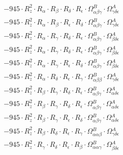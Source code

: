 \documentclass{article}
\begin{document}
\begin{subequations}
\begin{gather}
\begin{array}{c}
 \\[0.2em] 		 - 945 \cdot R_{z}^{2} \cdot R_{\alpha{}} \cdot R_{\beta{}} \cdot R_{\delta{}} \cdot R_{\epsilon{}} \cdot \Omega{}^{B}_{\alpha{}\beta{}\gamma{}} \cdot \Omega{}^{A}_{\gamma{}\delta{}\epsilon{}} 
 \\[0.2em] 		 - 945 \cdot R_{z}^{2} \cdot R_{\alpha{}} \cdot R_{\beta{}} \cdot R_{\epsilon{}} \cdot R_{\delta{}} \cdot \Omega{}^{B}_{\alpha{}\beta{}\gamma{}} \cdot \Omega{}^{A}_{\gamma{}\delta{}\epsilon{}} 
 \\[0.2em] 		 - 945 \cdot R_{z}^{2} \cdot R_{\alpha{}} \cdot R_{\gamma{}} \cdot R_{\delta{}} \cdot R_{\epsilon{}} \cdot \Omega{}^{B}_{\alpha{}\beta{}\gamma{}} \cdot \Omega{}^{A}_{\beta{}\delta{}\epsilon{}} 
 \\[0.2em] 		 - 945 \cdot R_{z}^{2} \cdot R_{\alpha{}} \cdot R_{\gamma{}} \cdot R_{\delta{}} \cdot R_{\epsilon{}} \cdot \Omega{}^{B}_{\alpha{}\beta{}\gamma{}} \cdot \Omega{}^{A}_{\beta{}\delta{}\epsilon{}} 
 \\[0.2em] 		 - 945 \cdot R_{z}^{2} \cdot R_{\alpha{}} \cdot R_{\gamma{}} \cdot R_{\epsilon{}} \cdot R_{\delta{}} \cdot \Omega{}^{B}_{\alpha{}\beta{}\gamma{}} \cdot \Omega{}^{A}_{\beta{}\delta{}\epsilon{}} 
 \\[0.2em] 		 - 945 \cdot R_{z}^{2} \cdot R_{\alpha{}} \cdot R_{\delta{}} \cdot R_{\epsilon{}} \cdot R_{\gamma{}} \cdot \Omega{}^{B}_{\alpha{}\beta{}\beta{}} \cdot \Omega{}^{A}_{\gamma{}\delta{}\epsilon{}} 
 \\[0.2em] 		 - 945 \cdot R_{z}^{2} \cdot R_{\beta{}} \cdot R_{\gamma{}} \cdot R_{\delta{}} \cdot R_{\epsilon{}} \cdot \Omega{}^{B}_{\alpha{}\beta{}\gamma{}} \cdot \Omega{}^{A}_{\alpha{}\delta{}\epsilon{}} 
 \\[0.2em] 		 - 945 \cdot R_{z}^{2} \cdot R_{\beta{}} \cdot R_{\gamma{}} \cdot R_{\delta{}} \cdot R_{\epsilon{}} \cdot \Omega{}^{B}_{\alpha{}\beta{}\gamma{}} \cdot \Omega{}^{A}_{\alpha{}\delta{}\epsilon{}} 
 \\[0.2em] 		 - 945 \cdot R_{z}^{2} \cdot R_{\beta{}} \cdot R_{\gamma{}} \cdot R_{\epsilon{}} \cdot R_{\delta{}} \cdot \Omega{}^{B}_{\alpha{}\beta{}\gamma{}} \cdot \Omega{}^{A}_{\alpha{}\delta{}\epsilon{}} 
 \\[0.2em] 		 - 945 \cdot R_{z}^{2} \cdot R_{\beta{}} \cdot R_{\delta{}} \cdot R_{\epsilon{}} \cdot R_{\gamma{}} \cdot \Omega{}^{B}_{\alpha{}\alpha{}\beta{}} \cdot \Omega{}^{A}_{\gamma{}\delta{}\epsilon{}} 
 \\[0.2em] 		 - 945 \cdot R_{z}^{2} \cdot R_{\gamma{}} \cdot R_{\delta{}} \cdot R_{\epsilon{}} \cdot R_{\beta{}} \cdot \Omega{}^{B}_{\alpha{}\alpha{}\gamma{}} \cdot \Omega{}^{A}_{\beta{}\delta{}\epsilon{}} 

\end{array}
\end{gather}
\end{subequations}
\end{document}
